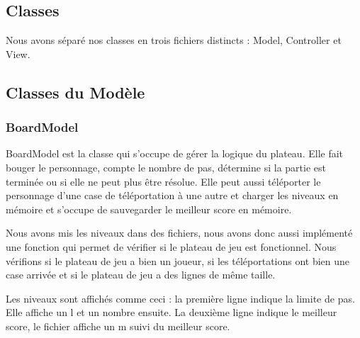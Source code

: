 \documentclass[utf8]{article}
\begin{document}
\begin{large}
\par


\section{Classes}
\indent
\par
Nous avons séparé nos classes en trois fichiers distincts : Model, Controller et View.
\par
\subsection{Classes du Modèle}

\subsubsection{BoardModel}
\indent
\par
BoardModel est la classe qui s'occupe de gérer la logique du plateau. Elle fait
bouger le personnage, compte le nombre de pas, détermine si la partie est
terminée ou si elle ne peut plus être résolue. Elle peut aussi téléporter le
personnage d'une case de téléportation à une autre et charger les niveaux en
mémoire et s'occupe de sauvegarder le meilleur score en mémoire.
\par
\indent
\par
Nous avons mis les niveaux dans des fichiers, nous avons donc aussi implémenté
une fonction qui permet de vérifier si le plateau de jeu est fonctionnel. Nous
vérifions si le plateau de jeu a bien un joueur, si les téléportations ont bien une
case arrivée et si le plateau de jeu a des lignes de même taille.
\par
Les niveaux sont affichés comme ceci : la première ligne indique la limite de
pas. Elle affiche un l et un nombre ensuite. La deuxième ligne indique le
meilleur score, le fichier affiche un m suivi du meilleur score.
\par


\end{large}
\end{document}
